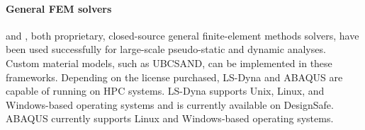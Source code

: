 \paragraph{General FEM solvers}
 and , both proprietary, closed-source general finite-element methods solvers, have been used successfully for large-scale pseudo-static and dynamic analyses. Custom material models, such as UBCSAND, can be implemented in these frameworks. Depending on the license purchased, LS-Dyna and ABAQUS are capable of running on HPC systems. LS-Dyna supports Unix, Linux, and Windows-based operating systems and is currently available on DesignSafe. ABAQUS currently supports Linux and Windows-based operating systems.




